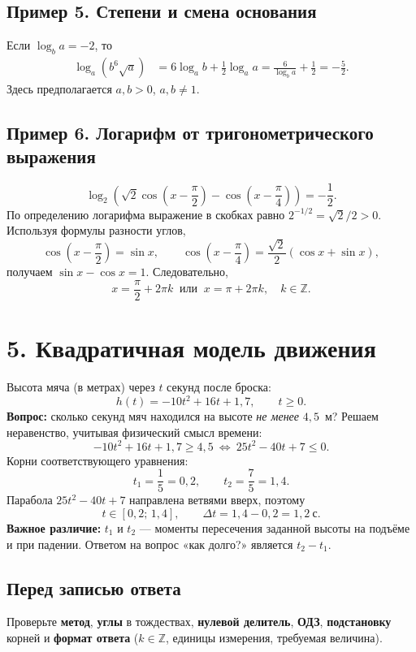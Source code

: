 \documentclass[a4paper,12pt]{article}
\newcommand{\key}[1]{\textcolor{darkaccent}{\textbf{#1}}}
\begin{document}
\subsection*{Пример 5. Степени и смена основания}
Если $\log_b a=-2$, то
\[
\begin{aligned}
\log_a(b^6\sqrt a)
&=6\log_a b+\tfrac12\log_a a
=\frac6{\log_b a}+\frac12
=\boxed{-\frac52}.
\end{aligned}
\]
Здесь предполагается $a,b>0$, $a,b\ne1$.

\clearpage
\subsection*{Пример 6. Логарифм от тригонометрического выражения}
\[
\log_2\!\left(\sqrt2\cos\!\left(x-\frac\pi2\right)
-\cos\!\left(x-\frac\pi4\right)\right)=-\frac12.
\]
По определению логарифма выражение в скобках равно $2^{-1/2}=\sqrt2/2>0$.
Используя формулы разности углов,
\[
\cos\!\left(x-\frac\pi2\right)=\sin x,\qquad
\cos\!\left(x-\frac\pi4\right)=\frac{\sqrt2}{2}(\cos x+\sin x),
\]
получаем $\sin x-\cos x=1$. Следовательно,
\[
\boxed{x=\frac\pi2+2\pi k\;\;\text{или}\;\;x=\pi+2\pi k,\quad k\in\mathbb Z.}
\]
\vspace{4mm}
\section*{5. Квадратичная модель движения}
Высота мяча (в метрах) через $t$ секунд после броска:
\[
h(t)=-10t^2+16t+1,7,\qquad t\ge0.
\]
\key{Вопрос:} сколько секунд мяч находился на высоте \emph{не менее} $4,5$~м?
Решаем неравенство, учитывая физический смысл времени:
\[
-10t^2+16t+1,7\ge4,5
\ \Longleftrightarrow\
25t^2-40t+7\le0.
\]
Корни соответствующего уравнения:
\[
t_1=\frac15=0,2,\qquad t_2=\frac75=1,4.
\]
Парабола $25t^2-40t+7$ направлена ветвями вверх, поэтому
\[
t\in[0,2;\,1,4],\qquad \boxed{\Delta t=1,4-0,2=1,2\ \text{с}.}
\]
\key{Важное различие:} $t_1$ и $t_2$ --- моменты пересечения заданной высоты на подъёме и при падении. Ответом на вопрос «как долго?» является $t_2-t_1$.

\subsection*{Перед записью ответа}
Проверьте \key{метод}, \key{углы} в тождествах, \key{нулевой делитель},
\key{ОДЗ}, \key{подстановку} корней и \key{формат ответа}
($k\in\mathbb Z$, единицы измерения, требуемая величина).
\clearpage
\end{document}
